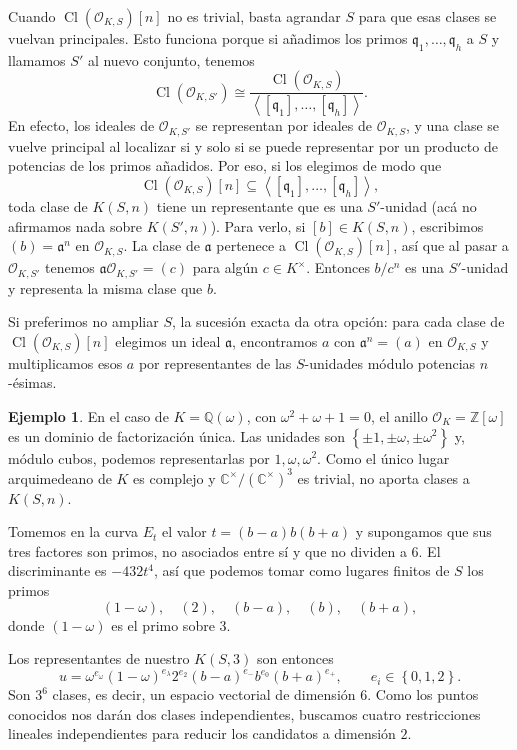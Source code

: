 \documentclass[a4paper]{book}
\theoremstyle{definition}
\newtheorem{example}[definition]{Ejemplo}
\theoremstyle{plain}
\newcommand{\CC}{\mathbb{C}}
\newcommand{\QQ}{\mathbb{Q}}
\newcommand{\ZZ}{\mathbb{Z}}
\newcommand{\OO}{\mathcal{O}}
\newcommand{\aaa}{\mathfrak{a}}
\newcommand{\lc}{\left<}
\newcommand{\rc}{\right>}
\newcommand{\lla}{\left\lbrace}
\newcommand{\rla}{\right\rbrace}
\begin{document}
Cuando $\operatorname{Cl}(\OO_{K,S})[n]$ no es trivial, basta agrandar $S$ para que esas clases se vuelvan principales. Esto funciona porque si añadimos los primos $\mathfrak q_1,\ldots,\mathfrak q_h$ a $S$ y llamamos $S'$ al nuevo conjunto, tenemos
\[
\operatorname{Cl}(\OO_{K,S'})\cong
\frac{\operatorname{Cl}(\OO_{K,S})}{\lc[\mathfrak q_1],\ldots,[\mathfrak q_h]\rc}.
\]
En efecto, los ideales de $\OO_{K,S'}$ se representan por ideales de $\OO_{K,S}$, y una clase se vuelve principal al localizar si y solo si se puede representar por un producto de potencias de los primos añadidos. Por eso, si los elegimos de modo que
\[
\operatorname{Cl}(\OO_{K,S})[n]\subseteq
\lc[\mathfrak q_1],\ldots,[\mathfrak q_h]\rc,
\]
toda clase de $K(S,n)$ tiene un representante que es una $S'$-unidad (acá no afirmamos nada sobre $K(S',n)$). Para verlo, si $[b]\in K(S,n)$, escribimos $(b)=\aaa^n$ en $\OO_{K,S}$. La clase de $\aaa$ pertenece a $\operatorname{Cl}(\OO_{K,S})[n]$, así que al pasar a $\OO_{K,S'}$ tenemos $\aaa\OO_{K,S'}=(c)$ para algún $c\in K^\times$. Entonces $b/c^n$ es una $S'$-unidad y representa la misma clase que $b$.

Si preferimos no ampliar $S$, la sucesión exacta da otra opción: para cada clase de $\operatorname{Cl}(\OO_{K,S})[n]$ elegimos un ideal $\aaa$, encontramos $a$ con $\aaa^n=(a)$ en $\OO_{K,S}$ y multiplicamos esos $a$ por representantes de las $S$-unidades módulo potencias $n$-ésimas.

\begin{example}
En el caso de $K=\QQ(\omega)$, con $\omega^2+\omega+1=0$, el anillo $\OO_K=\ZZ[\omega]$ es un dominio de factorización única. Las unidades son $\lla\pm1,\pm\omega,\pm\omega^2\rla$ y, módulo cubos, podemos representarlas por $1,\omega,\omega^2$. Como el único lugar arquimedeano de $K$ es complejo y $\CC^\times/{(\CC^\times)}^3$ es trivial, no aporta clases a $K(S,n)$.

Tomemos en la curva $E_t$ el valor $t=(b-a)b(b+a)$ y supongamos que sus tres factores son primos, no asociados entre sí y que no dividen a $6$. El discriminante es $-432t^4$, así que podemos tomar como lugares finitos de $S$ los primos
\[
(1-\omega),\quad (2),\quad (b-a),\quad (b),\quad (b+a),
\]
donde $(1-\omega)$ es el primo sobre $3$.

Los representantes de nuestro $K(S,3)$ son entonces
\[
u=\omega^{e_\omega}{(1-\omega)}^{e_\lambda}2^{e_2}
{(b-a)}^{e_-} b^{e_0} {(b+a)}^{e_+},\qquad e_i\in\lla0,1,2\rla.
\]
Son $3^6$ clases, es decir, un espacio vectorial de dimensión $6$. Como los puntos conocidos nos darán dos clases independientes, buscamos cuatro restricciones lineales independientes para reducir los candidatos a dimensión $2$. 
\end{example}
\end{document}
